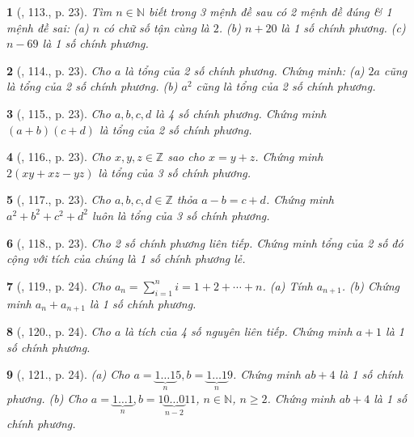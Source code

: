 \documentclass{article}
\newtheorem{baitoan}{}
\begin{document}
\begin{baitoan}[\cite{Tuyen_Toan_8}, 113., p. 23]
	Tìm $n\in\mathbb{N}$ biết trong 3 mệnh đề sau có 2 mệnh đề đúng \& 1 mệnh đề sai: (a) $n$ có chữ số tận cùng là $2$. (b) $n + 20$ là 1 số chính phương. (c) $n - 69$ là 1 số chính phương.
\end{baitoan}

\begin{baitoan}[\cite{Tuyen_Toan_8}, 114., p. 23]
	Cho $a$ là tổng của 2 số chính phương. Chứng minh: (a) $2a$ cũng là tổng của 2 số chính phương. (b) $a^2$ cũng là tổng của 2 số chính phương.
\end{baitoan}

\begin{baitoan}[\cite{Tuyen_Toan_8}, 115., p. 23]
	Cho $a,b,c,d$ là 4 số chính phương. Chứng minh $(a + b)(c + d)$ là tổng của 2 số chính phương.
\end{baitoan}

\begin{baitoan}[\cite{Tuyen_Toan_8}, 116., p. 23]
	Cho $x,y,z\in\mathbb{Z}$ sao cho $x = y + z$. Chứng minh $2(xy + xz - yz)$ là tổng của 3 số chính phương.
\end{baitoan}

\begin{baitoan}[\cite{Tuyen_Toan_8}, 117., p. 23]
	Cho $a,b,c,d\in\mathbb{Z}$ thỏa $a - b = c + d$. Chứng minh $a^2 + b^2 + c^2 + d^2$ luôn là tổng của 3 số chính phương.
\end{baitoan}

\begin{baitoan}[\cite{Tuyen_Toan_8}, 118., p. 23]
	Cho 2 số chính phương liên tiếp. Chứng minh tổng của 2 số đó cộng với tích của chúng là 1 số chính phương lẻ.
\end{baitoan}

\begin{baitoan}[\cite{Tuyen_Toan_8}, 119., p. 24]
	Cho $a_n = \sum_{i=1}^n i  = 1 + 2 + \cdots + n$. (a) Tính $a_{n+1}$. (b) Chứng minh $a_n + a_{n+1}$ là 1 số chính phương.
\end{baitoan}

\begin{baitoan}[\cite{Tuyen_Toan_8}, 120., p. 24]
	Cho $a$ là tích của 4 số nguyên liên tiếp. Chứng minh $a + 1$ là 1 số chính phương.
\end{baitoan}

\begin{baitoan}[\cite{Tuyen_Toan_8}, 121., p. 24]
	(a) Cho $a = \underbrace{1\ldots1}_n5,b = \underbrace{1\ldots1}_n9$. Chứng minh $ab + 4$ là 1 số chính phương. (b) Cho $a = \underbrace{1\ldots1}_n,b = 1\underbrace{0\ldots0}_{n-2}11$, $n\in\mathbb{N}$, $n\ge2$. Chứng minh $ab + 4$ là 1 số chính phương.
\end{baitoan}
\end{document}
